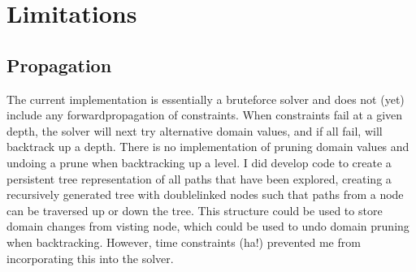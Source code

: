 \documentclass[letterpaper,10pt,english]{sphinxmanual}
\begin{document}
\chapter{Limitations}
\label{\detokenize{index:limitations}}

\section{Propagation}
\label{\detokenize{index:propagation}}
\sphinxAtStartPar
The current implementation is essentially a brute\sphinxhyphen{}force solver and does not (yet)
include any forward\sphinxhyphen{}propagation of constraints.
When constraints fail at a given depth, the solver will next try alternative domain values,
and if all fail, will backtrack up a depth. There is no implementation of pruning domain values
and undoing a prune when backtracking up a level.
I did develop code to create a persistent tree representation of all paths that have been explored,
creating a recursively generated tree with double\sphinxhyphen{}linked nodes such that paths from a node
can be traversed up or down the tree.
This structure could be used to store domain changes from visting node, which could be used
to undo domain pruning when backtracking.
However, time constraints (ha!) prevented me from incorporating this into the solver.
\end{document}
